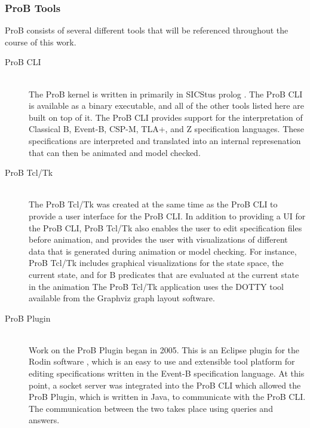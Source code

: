\subsubsection{ProB Tools}

ProB consists of several different tools that will be referenced throughout the course of this work. 

\begin{description}

	\item[ProB CLI] \hfill \\ 
	The ProB kernel is written in primarily in SICStus prolog \cite{LeBu08_225}. The ProB CLI is available as a binary executable, and all of the other tools listed here are built on top of it. The ProB CLI provides support for the interpretation of Classical B, Event-B, CSP-M, TLA+, and Z specification languages. These specifications are interpreted and translated into an internal represenation that can then be animated and model checked.

	\item[ProB Tcl/Tk] \hfill \\
	The ProB Tcl/Tk was created at the same time as the ProB CLI to provide a user interface for the ProB CLI. In addition to providing a UI for the ProB CLI, ProB Tcl/Tk also enables the user to edit specification files before animation, and provides the user with visualizations of different data that is generated during animation or model checking. For instance, ProB Tcl/Tk includes graphical visualizations for the state space, the current state, and for B predicates that are evaluated at the current state in the animation \cite{LeSaBeLu08_228} The ProB Tcl/Tk application uses the DOTTY tool available from the Graphviz graph layout software.

	\item[ProB Plugin] \hfill \\
	Work on the ProB Plugin began in 2005. This is an Eclipse plugin for the Rodin software \cite{BuHa07_292}, which is an easy to use and extensible tool platform for editing specifications written in the Event-B specification language. At this point, a socket server was integrated into the ProB CLI which allowed the ProB Plugin, which is written in Java, to communicate with the ProB CLI. The communication between the two takes place using queries and answers.


\end{description}
